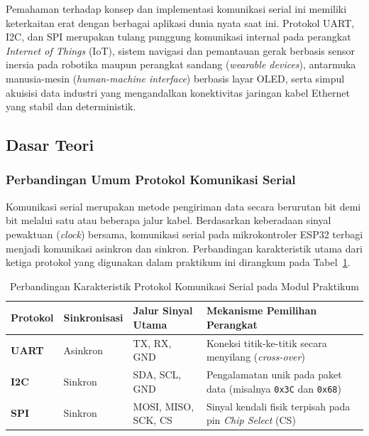 Pemahaman terhadap konsep dan implementasi komunikasi serial ini memiliki keterkaitan erat dengan berbagai aplikasi dunia nyata saat ini. Protokol UART, I2C, dan SPI merupakan tulang punggung komunikasi internal pada perangkat \textit{Internet of Things} (IoT), sistem navigasi dan pemantauan gerak berbasis sensor inersia pada robotika maupun perangkat sandang (\textit{wearable devices}), antarmuka manusia-mesin (\textit{human-machine interface}) berbasis layar OLED, serta simpul akuisisi data industri yang mengandalkan konektivitas jaringan kabel Ethernet yang stabil dan deterministik.

\subsection{Dasar Teori}

\subsubsection{Perbandingan Umum Protokol Komunikasi Serial}
Komunikasi serial merupakan metode pengiriman data secara berurutan bit demi bit melalui satu atau beberapa jalur kabel. Berdasarkan keberadaan sinyal pewaktuan (\textit{clock}) bersama, komunikasi serial pada mikrokontroler ESP32 terbagi menjadi komunikasi asinkron dan sinkron. Perbandingan karakteristik utama dari ketiga protokol yang digunakan dalam praktikum ini dirangkum pada Tabel~\ref{tab:perbandingan_serial}.

\begin{table}[h!]
    \centering
    \caption{Perbandingan Karakteristik Protokol Komunikasi Serial pada Modul Praktikum}
    \label{tab:perbandingan_serial}
    \vspace{4pt}
    \begin{tabularx}{\textwidth}{>{\bfseries}l l X X}
        \toprule
        Protokol & Sinkronisasi & Jalur Sinyal Utama & Mekanisme Pemilihan Perangkat \\
        \midrule
        UART & Asinkron & TX, RX, GND & Koneksi titik-ke-titik secara menyilang (\textit{cross-over}) \\
        \addlinespace[4pt]
        I2C  & Sinkron  & SDA, SCL, GND & Pengalamatan unik pada paket data (misalnya \texttt{0x3C} dan \texttt{0x68}) \\
        \addlinespace[4pt]
        SPI  & Sinkron  & MOSI, MISO, SCK, CS & Sinyal kendali fisik terpisah pada pin \textit{Chip Select} (CS) \\
        \bottomrule
    \end{tabularx}
\end{table}

